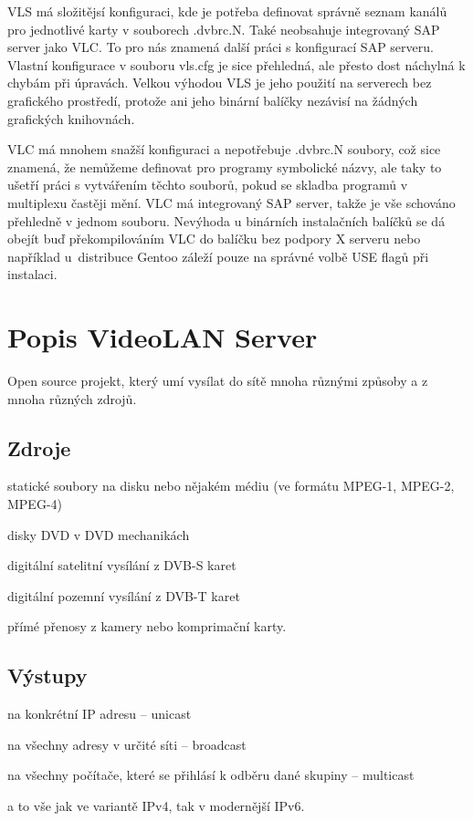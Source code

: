 VLS má složitějsí konfiguraci, kde je potřeba definovat správně seznam kanálů pro jednotlivé karty v souborech .dvbrc.N. Také neobsahuje integrovaný SAP server jako VLC. To pro nás znamená další práci s konfigurací SAP serveru. Vlastní konfigurace v souboru vls.cfg je sice přehledná, ale přesto dost náchylná k chybám při úpravách. Velkou výhodou VLS je jeho použití na serverech bez grafického prostředí, protože ani jeho binární balíčky nezávisí na žádných grafických knihovnách.

VLC má mnohem snažší konfiguraci a nepotřebuje .dvbrc.N soubory, což sice znamená, že nemůžeme definovat pro programy symbolické názvy, ale taky to ušetří práci s vytvářením těchto souborů, pokud se skladba programů v multiplexu častěji mění. VLC má integrovaný SAP server, takže je vše schováno přehledně v jednom souboru. Nevýhoda u binárních instalačních balíčků se dá obejít buď překompilováním VLC do balíčku bez podpory X serveru nebo například u~distribuce Gentoo záleží pouze na správné volbě USE flagů při instalaci.

\section{Popis VideoLAN Server}
Open source projekt, který umí vysílat do sítě mnoha různými způsoby a z mnoha různých zdrojů.

\subsection{Zdroje}
\bitem
\item statické soubory na disku nebo nějakém médiu (ve formátu MPEG-1, MPEG-2, MPEG-4)
\item disky DVD v DVD mechanikách
\item digitální satelitní vysílání z DVB-S karet
\item digitální pozemní vysílání z DVB-T karet
\item přímé přenosy z kamery nebo komprimační karty.
\eitem

\subsection{Výstupy}
\bitem
\item na konkrétní IP adresu -- unicast
\item na všechny adresy v určité síti -- broadcast
\item na všechny počítače, které se přihlásí k odběru dané skupiny -- multicast
\item a to vše jak ve variantě IPv4, tak v modernější IPv6.
\eitem

